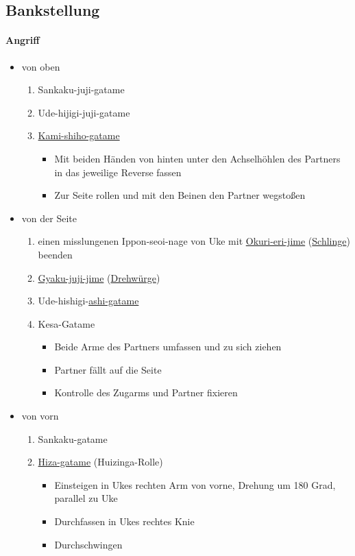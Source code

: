 \documentclass[justified, a4paper, notitlepage, captions=tableheading, nobib]{tufte-handout}
\begin{document}
\subsection{\label{org9811981}Bankstellung }
\label{sec:orgff70759}
\paragraph{Angriff}
\label{sec:org6b6664f}
\begin{itemize}
\item von oben
\begin{enumerate}
\item Sankaku-juji-gatame
\item Ude-hijigi-juji-gatame
\item \hyperref[orgc73b9b4]{Kami-shiho-gatame}
\begin{itemize}
\item Mit beiden Händen von hinten unter den Achselhöhlen des Partners in das jeweilige Reverse fassen
\item Zur Seite rollen und mit den Beinen den Partner wegstoßen
\end{itemize}
\end{enumerate}
\item von der Seite
\begin{enumerate}
\item einen misslungenen Ippon-seoi-nage von Uke mit \hyperref[orgb7daffb]{Okuri-eri-jime} (\hyperref[org6ab0f03]{Schlinge}) beenden
\item \hyperref[org6766ded]{Gyaku-juji-jime} (\hyperref[org7eb3e53]{Drehwürge})
\item Ude-hishigi-\hyperref[org38f5fab]{ashi-gatame}
\item Kesa-Gatame
\begin{itemize}
\item Beide Arme des Partners umfassen und zu sich ziehen
\item Partner fällt auf die Seite
\item Kontrolle des Zugarms und Partner fixieren
\end{itemize}
\end{enumerate}
\item von vorn
\begin{enumerate}
\item Sankaku-gatame
\item \hyperref[orgb18dd1d]{Hiza-gatame} (Huizinga-Rolle)
\begin{itemize}
\item Einsteigen in Ukes rechten Arm von vorne, Drehung um 180 Grad, parallel zu Uke
\item Durchfassen in Ukes rechtes Knie
\item Durchschwingen
\end{itemize}
\end{enumerate}
\end{itemize}
\end{document}
